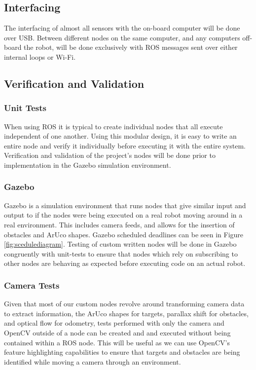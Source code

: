 \documentclass{article}
\begin{document}
	\subsection{Interfacing}
	
	The interfacing of almost all sensors with the on-board computer will be done over USB. Between different nodes on the same computer, and any computers off-board the robot, will be done exclusively with ROS messages sent over either internal loops or Wi-Fi.

	\subsection{Verification and Validation}
	
	\subsubsection{Unit Tests}
	
	When using ROS it is typical to create individual nodes that all execute independent of one another. Using this modular design, it is easy to write an entire node and verify it individually before executing it with the entire system.	Verification and validation of the project's nodes will be done prior to implementation in the Gazebo simulation environment.
	
	\subsubsection{Gazebo}
	
	Gazebo is a simulation environment that runs nodes that give similar input and output to if the nodes were being executed on a real robot moving around in a real environment. This includes camera feeds, and allows for the insertion of obstacles and ArUco shapes. Gazebo scheduled deadlines can be seen in Figure \ref{fig:scedulediagram}. Testing of custom written nodes will be done in Gazebo congruently with unit-tests to ensure that nodes which rely on subscribing to other nodes are behaving as expected before executing code on an actual robot.
	
	\subsubsection{Camera Tests}
	
	Given that most of our custom nodes revolve around transforming camera data to extract information, the ArUco shapes for targets, parallax shift for obstacles, and optical flow for odometry, tests performed with only the camera and OpenCV outside of a node can be created and and executed without being contained within a ROS node. This will be useful as we can use OpenCV's feature highlighting capabilities to ensure that targets and obstacles are being identified while moving a camera through an environment. 
	
\end{document}
